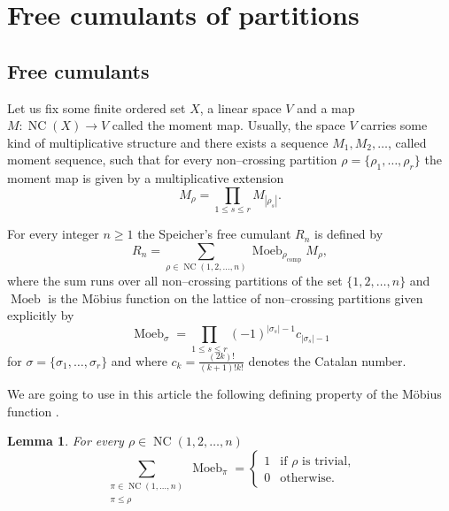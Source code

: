 \documentclass[12pt,dvips]{amsart}
\numberwithin{equation}{section} \numberwithin{figure}{section}
\theoremstyle{plain}
\newtheorem{lemma}{Lemma}[section]
\theoremstyle{definition}
\theoremstyle{remark}
\DeclareMathOperator{\comp}{comp}
\DeclareMathOperator{\NC}{NC}
\DeclareMathOperator{\Moeb}{Moeb}
\begin{document}
%




\section{Free cumulants of partitions}
\label{sec:mainresult}



\subsection{Free cumulants}
\label{subsec:freeprobability} 


 Let us fix some finite ordered set $X$, a
linear space $V$ and a map $M:\NC(X)\rightarrow V$ called the moment
map. Usually, the space $V$ carries some kind of multiplicative
structure and there exists a sequence $M_1,M_2,\dots$, called moment
sequence, such that for every non--crossing partition
$\rho=\{\rho_1,\dots,\rho_r\}$ the moment map is given by a
multiplicative extension
\begin{equation}
\label{eq:momentmappa} M_{\rho}=\prod_{1\leq s\leq r} M_{|\rho_s|}.
\end{equation}


For every integer $n\geq 1$ the Speicher's free cumulant $R_n$
\cite{Speicher1994,Speicher1997,Speicher1998} is defined by
\index{$Moeb$@$\Moeb_{\pi}$} 
\begin{equation}
\label{eq:definicjawolnejkumulanty}
R_{n}=\sum_{\rho\in\NC(1,2,\dots,n)} \Moeb_{\rho_{\comp}} M_{\rho},
\end{equation}
where the sum runs over all non--crossing partitions of the set
$\{1,2,\dots,n\}$ and $\Moeb$ is the M\"obius function on the
lattice of non--crossing partitions given explicitly by
$$\Moeb_{\sigma}=\prod_{1\leq s\leq r} (-1)^{|\sigma_s|-1}
 c_{|\sigma_s|-1}$$
for $\sigma=\{\sigma_1,\dots,\sigma_r\}$ and where
$c_k=\frac{(2k)!}{(k+1)! k!}$ denotes the Catalan number.



We are going to use in this article the following defining property
of the M\"obius function \cite{Speicher1994}.
\begin{lemma}
\label{lem:pocomoebius} For every $\rho\in\NC(1,2,\dots,n)$
$$\sum_{\substack{\pi\in\NC(1,\dots,n)\\ \pi\leq \rho}} \Moeb_{\pi}=
 \begin{cases} 1 & \text{if } \rho \text{ is trivial,} \\
0 & \text{otherwise.} \end{cases}
$$
\end{lemma}
\end{document}
